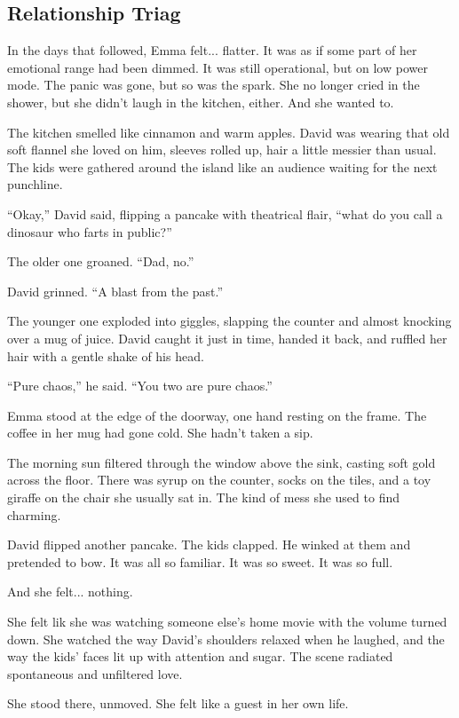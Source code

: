 
\subsection{Relationship Triag}

In the days that followed, Emma felt... flatter. It was as if some part of her emotional 
range had been dimmed. It was still operational, but on low power mode. The panic was gone, but so was the 
spark. She no longer cried in the shower, but she didn’t laugh in the kitchen, either. And she 
wanted to.

The kitchen smelled like cinnamon and warm apples. David was wearing that old soft flannel she loved on 
him, sleeves rolled up, hair a little messier than usual. The kids were gathered around the island like 
an audience waiting for the next punchline.

``Okay,'' David said, flipping a pancake with theatrical flair, ``what do you call a dinosaur who farts 
in public?''

The older one groaned. ``Dad, no.''

David grinned. ``A blast from the past.''

The younger one exploded into giggles, slapping the counter and almost knocking over a mug of juice.
David caught it just in time, handed it back, and ruffled her hair with a gentle shake of his head.

``Pure chaos,'' he said. ``You two are pure chaos.''

Emma stood at the edge of the doorway, one hand resting on the frame. The coffee in her mug had gone cold. 
She hadn’t taken a sip.

The morning sun filtered through the window above the sink, casting soft gold across the floor. There was 
syrup on the counter, socks on the tiles, and a toy giraffe on the chair she usually sat in. The kind of mess 
she used to find charming. 

David flipped another pancake. The kids clapped. He winked at them and pretended to bow. It was all so familiar. 
It was so sweet. It was so full.

And she felt... nothing.

She felt lik she was watching someone else’s home movie with the volume turned down. She watched the way David’s 
shoulders relaxed when he laughed, and the way the kids’ faces lit up with attention and sugar. The scene 
radiated spontaneous and unfiltered love.

She stood there, unmoved. She felt like a guest in her own life.

